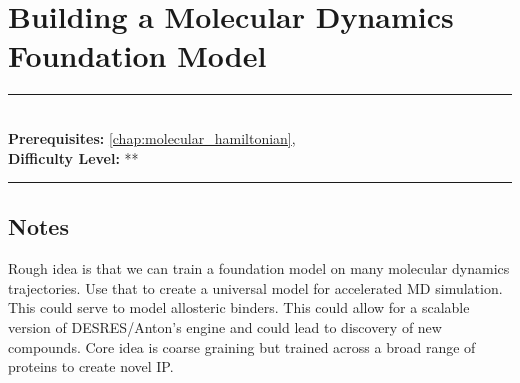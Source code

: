 \documentclass[book.tex]{subfiles}
\begin{document}
\chapter{Building a Molecular Dynamics Foundation Model}
\label{chap:coarse}
\noindent\rule{11cm}{0.4pt} \\
\textbf{Prerequisites:}  \autoref{chap:molecular_hamiltonian},   \\
\textbf{Difficulty Level:} ** \\
\noindent\rule{11cm}{0.4pt}
\vspace{5mm}

\section{Notes}

Rough idea is that we can train a foundation model on many molecular dynamics trajectories. Use that to create a universal model for accelerated MD simulation. This could serve to model allosteric binders. This could allow for a scalable version of DESRES/Anton's engine and could lead to discovery of new compounds. Core idea is coarse graining but trained across a broad range of proteins to create novel IP.
\end{document}
